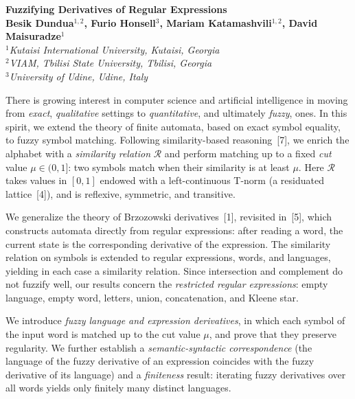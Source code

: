 \documentclass[11pt]{book}
\begin{document}


\begin{center}
    \textsf{\textbf{\Large Fuzzifying Derivatives of Regular Expressions}} \\[0.5cm]
    \textbf{Besik Dundua$^{1,2}$, Furio Honsell$^{3}$, Mariam Katamashvili$^{1,2}$, David Maisuradze$^{1}$} \\[0.2cm]
    $^{1}$\textit{Kutaisi International University, Kutaisi, Georgia} \\[0.05cm]
    $^{2}$\textit{VIAM, Tbilisi State University, Tbilisi, Georgia} \\[0.05cm]
    $^{3}$\textit{University of Udine, Udine, Italy}
\end{center}

\bigskip

There is growing interest in computer science and artificial intelligence in moving
from {\em exact}, {\em qualitative} settings to {\em quantitative}, and ultimately
{\em fuzzy}, ones. In this
spirit, we extend the theory of finite automata, based on exact symbol equality, to
fuzzy symbol matching. Following
similarity-based reasoning~[7], we enrich the alphabet with a {\em similarity relation}
$\mathcal R$ and perform matching up to a fixed {\em cut} value $\mu\in(0,1]$: two
symbols match when their similarity is at least $\mu$. Here $\mathcal R$ takes values in
$[0,1]$ endowed with a left-continuous T-norm (a residuated lattice~[4]), and is
reflexive, symmetric, and transitive.

We generalize the theory of Brzozowski derivatives~[1], revisited in~[5], which
constructs automata directly from regular expressions: after reading a word, the
current state is the corresponding derivative of the expression. The similarity relation
on symbols is extended to regular expressions, words, and languages, yielding in each
case a similarity relation. Since intersection and complement do not fuzzify well, our
results concern the {\em restricted regular expressions}: empty language, empty word,
letters, union, concatenation, and Kleene star.

We introduce {\em fuzzy language and expression derivatives}, in which each symbol of the
input word is matched up to the cut value $\mu$, and prove that they preserve
regularity. We further establish a
{\em semantic-syntactic correspondence} (the language of the fuzzy derivative of an
expression coincides with the fuzzy derivative of its language) and a {\em finiteness}
result: iterating fuzzy derivatives over all words yields only finitely many distinct
languages.
\end{document}
